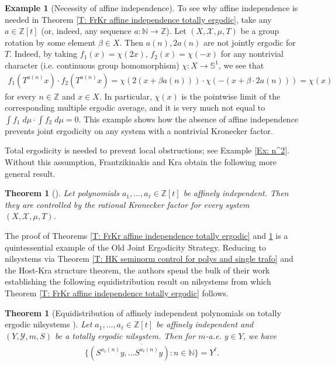 \documentclass[11pt]{amsart}
\newtheorem{theorem}[lemma]{Theorem}
\theoremstyle{definition}
\newtheorem{example}[lemma]{Example}
\newcommand{\N}{{\mathbb N}}
\renewcommand{\S}{\mathbb{S}}
\newcommand{\Z}{{\mathbb Z}}
\newcommand{\CX}{{\mathcal X}}
\newcommand{\CY}{{\mathcal Y}}
\newcommand{\1}{{\mathbf{1}}}
\begin{document}
\begin{example}[Necessity of affine independence]
    To see why affine independence is needed in Theorem \ref{T: FrKr affine independence totally ergodic}, take any $a\in\Z[t]$ (or, indeed, any sequence $a:\N\to\Z$). Let $(X, \CX, \mu, T)$ be a group rotation by some element $\beta\in X$. Then $a(n), 2a(n)$ are not jointly ergodic for $T$. Indeed, by taking $f_1(x) = \chi(2x)$, $f_2(x) = \chi(-x)$ for any nontrivial character (i.e. continuous group homomorphism) $\chi: X\to\S^1$, we see that
    \begin{align*}
        f_1(T^{a(n)}x)\cdot f_2(T^{a(n)}x) = \chi(2(x + \beta a(n)))\cdot \chi(-(x+\beta \cdot 2 a(n))) = \chi(x)
    \end{align*}
    for every $n\in\Z$ and $x\in X$.
    In particular, $\chi(x)$ is the pointwise limit of the corresponding multiple ergodic average, and it is very much not equal to $\int f_1\; d\mu \cdot \int f_2\; d\mu = 0$. This example shows how the absence of affine independence prevents joint ergodicity on any system with a nontrivial Kronecker factor. 
\end{example}

Total ergodicity is needed to prevent local obstructions; see Example \ref{Ex: n^2}. Without this assumption, Frantzikinakis and Kra obtain the following more general result.
\begin{theorem}%
[{\cite[Theorem 1.1]{FrKr06}}]\label{T: FrKr affine independence}
    Let polynomials $a_1, \ldots, a_\ell\in\Z[t]$ be affinely independent. Then they are controlled by the rational Kronecker factor for every system $(X, \CX, \mu, T)$.
\end{theorem}
The proof of Theorems \ref{T: FrKr affine independence totally ergodic} and \ref{T: FrKr affine independence} is a quintessential example of the Old Joint Ergodicity Strategy. Reducing to nilsystems via Theorem \ref{T: HK seminorm control for polys and single trafo} and the Host-Kra structure theorem, the authors spend the bulk of their work establishing the following equidistribution result on nilsystems from which Theorem \ref{T: FrKr affine independence totally ergodic} follows.
\begin{theorem}[Equidistribution of affinely independent polynomials on totally ergodic nilsystems {\cite[Theorem 1.2]{FrKr05}}]
    Let $a_1, \ldots, a_\ell\in\Z[t]$ be affinely independent and $(Y, \CY, m, S)$ be a totally ergodic nilsystem. Then for $m$-a.e. $y\in Y$, we have
    \begin{align*}
        \overline{\{(S^{a_1(n)}y, \ldots S^{a_\ell(n)}y)\colon n\in\N\}} = Y^\ell.
    \end{align*}
\end{theorem}
\end{document}

